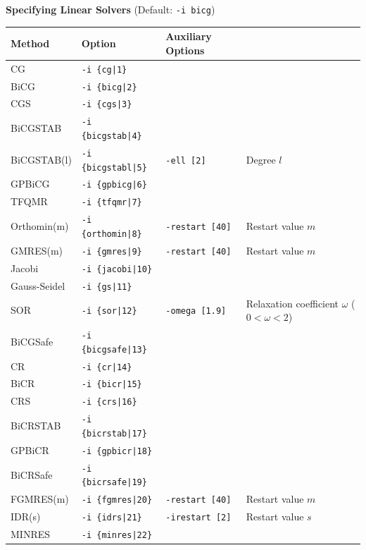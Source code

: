 \documentclass[a4paper]{article}
\begin{document}
\begin{minipage}[t]{\textwidth}
\begin{center}
{\bf Specifying Linear Solvers} (Default: \verb=-i bicg=) \\
\begin{tabular}{l|lll}\hline\hline
 Method      & Option              &  Auxiliary Options  & \\ \hline
 CG          & \verb=-i {cg|1}=         &    \\ 
 BiCG        & \verb=-i {bicg|2}=       &    \\
 CGS         & \verb=-i {cgs|3}=        &    \\
 BiCGSTAB    & \verb=-i {bicgstab|4}=   &    \\
 BiCGSTAB(l) & \verb=-i {bicgstabl|5}=  & \verb=-ell [2]=      & Degree $l$ \\
 GPBiCG      & \verb=-i {gpbicg|6}=     &    \\
 TFQMR       & \verb=-i {tfqmr|7}=      &    \\
 Orthomin(m) & \verb=-i {orthomin|8}=   & \verb=-restart [40]= & Restart value $m$  \\
 GMRES(m)    & \verb=-i {gmres|9}=      & \verb=-restart [40]= & Restart value $m$ \\ 
 Jacobi      & \verb=-i {jacobi|10}=    &    \\
 Gauss-Seidel& \verb=-i {gs|11}=        &    \\
 SOR         & \verb=-i {sor|12}=       & \verb=-omega [1.9]=  & Relaxation coefficient $\omega$ ($0<\omega<2$) \\
 BiCGSafe    & \verb=-i {bicgsafe|13}=     &    \\
 CR          & \verb=-i {cr|14}=        &    \\ 
 BiCR        & \verb=-i {bicr|15}=      &    \\
 CRS         & \verb=-i {crs|16}=       &    \\
 BiCRSTAB    & \verb=-i {bicrstab|17}=  &    \\
 GPBiCR      & \verb=-i {gpbicr|18}=    &    \\
 BiCRSafe    & \verb=-i {bicrsafe|19}=  &    \\
 FGMRES(m)   & \verb=-i {fgmres|20}=    & \verb=-restart [40]= & Restart value $m$   \\ 
 IDR(s)      & \verb=-i {idrs|21}=      & \verb=-irestart [2]= & Restart value $s$   \\ 
 MINRES      & \verb=-i {minres|22}=    &    \\
\hline         
\end{tabular}
\end{center}
\end{minipage}
\end{document}
